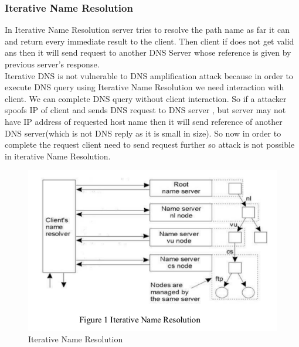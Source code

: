 \documentclass[11pt]{article}
\begin{document}
\subsubsection{Iterative Name Resolution}
In Iterative Name Resolution server tries to resolve the path name as far it can and return every immediate result to the client. Then client if does not get valid ans then it will send request to another DNS Server whose reference is given by previous server's response. \\
Iterative DNS is not vulnerable to DNS amplification attack because in order to execute DNS query using Iterative Name Resolution we need interaction with client. We can complete DNS query without client interaction. So if a attacker spoofs IP of client and sends DNS request to DNS server , but server may not have IP address of requested host name then it will send reference of another DNS server(which is not DNS reply as it is small in size). So now in order to complete the request client need to send request further so attack is not possible in iterative Name Resolution.
\begin{figure}[H]
\includegraphics[scale=0.6]{iter.png}
\caption{Iterative Name Resolution}
\end{figure}
\end{document}
